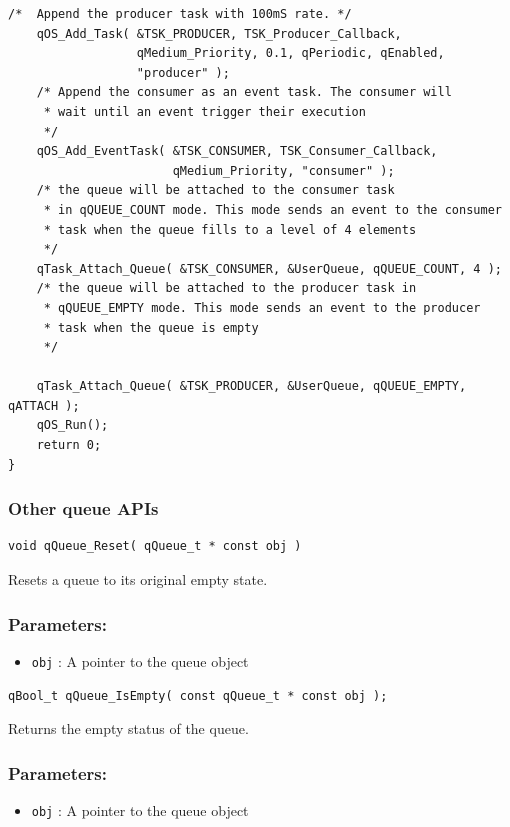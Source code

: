 \documentclass{article}
\begin{document}
\begin{lstlisting}[style=CStyle]
    /*  Append the producer task with 100mS rate. */
    qOS_Add_Task( &TSK_PRODUCER, TSK_Producer_Callback, 
                  qMedium_Priority, 0.1, qPeriodic, qEnabled, 
                  "producer" );
    /* Append the consumer as an event task. The consumer will
     * wait until an event trigger their execution
     */
    qOS_Add_EventTask( &TSK_CONSUMER, TSK_Consumer_Callback,
                       qMedium_Priority, "consumer" );
    /* the queue will be attached to the consumer task 
     * in qQUEUE_COUNT mode. This mode sends an event to the consumer
     * task when the queue fills to a level of 4 elements
     */
    qTask_Attach_Queue( &TSK_CONSUMER, &UserQueue, qQUEUE_COUNT, 4 );
    /* the queue will be attached to the producer task in
     * qQUEUE_EMPTY mode. This mode sends an event to the producer
     * task when the queue is empty
     */
     
    qTask_Attach_Queue( &TSK_PRODUCER, &UserQueue, qQUEUE_EMPTY, qATTACH );
    qOS_Run();
    return 0;
}

\end{lstlisting}    

\subsubsection{Other queue APIs}

\begin{lstlisting}[style=CStyle]
void qQueue_Reset( qQueue_t * const obj )
\end{lstlisting}

Resets a queue to its original empty state. 

\subsubsection*{Parameters:}
\begin{itemize}
    \item \lstinline{obj} : A pointer to the queue object
\end{itemize}

\noindent\hrulefill


\begin{lstlisting}[style=CStyle]
qBool_t qQueue_IsEmpty( const qQueue_t * const obj );
\end{lstlisting}

Returns the empty status of the queue. 

\subsubsection*{Parameters:}
\begin{itemize}
    \item \lstinline{obj} : A pointer to the queue object
\end{itemize}
\end{document}
